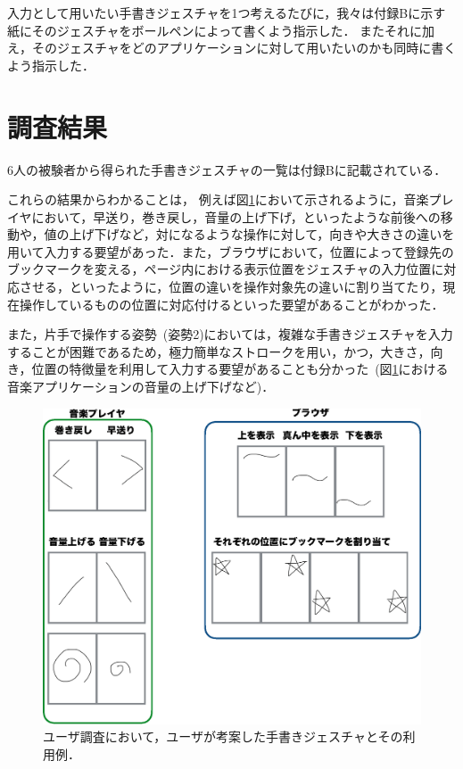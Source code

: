 入力として用いたい手書きジェスチャを1つ考えるたびに，我々は付録Bに示す紙にそのジェスチャをボールペンによって書くよう指示した．
またそれに加え，そのジェスチャをどのアプリケーションに対して用いたいのかも同時に書くよう指示した．


\section{調査結果}
6人の被験者から得られた手書きジェスチャの一覧は付録Bに記載されている．

これらの結果からわかることは，
例えば図\ref{user}において示されるように，音楽プレイヤにおいて，早送り，巻き戻し，音量の上げ下げ，といったような前後への移動や，値の上げ下げなど，対になるような操作に対して，向きや大きさの違いを用いて入力する要望があった．また，ブラウザにおいて，位置によって登録先のブックマークを変える，ページ内における表示位置をジェスチャの入力位置に対応させる，といったように，位置の違いを操作対象先の違いに割り当てたり，現在操作しているものの位置に対応付けるといった要望があることがわかった．

また，片手で操作する姿勢~(姿勢2)においては，複雑な手書きジェスチャを入力することが困難であるため，極力簡単なストロークを用い，かつ，大きさ，向き，位置の特徴量を利用して入力する要望があることも分かった~(図\ref{user}における音楽アプリケーションの音量の上げ下げなど)．

\begin{figure} [t]
 \begin{center}
  \includegraphics [width=0.8\columnwidth]{img/elicitation_example.eps}
  \caption{ユーザ調査において，ユーザが考案した手書きジェスチャとその利用例．}
  \label{user}
 \end{center}
\end{figure}

